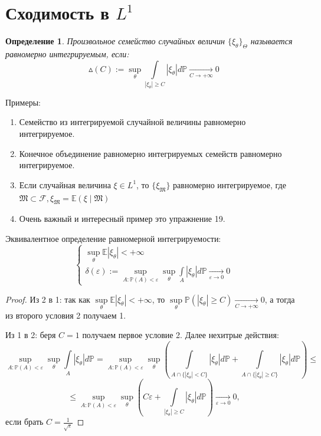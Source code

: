 \documentclass[12pt,a4paper]{article} %
\newtheorem{definition}{Определение}
\newcommand{\E}{\mathbb{E}}
\newcommand{\PR}{\mathbb{P}}
\newcommand{\F}{\mathcal{F}}
\newcommand{\M}{\mathfrak{M}}
\begin{document}
	\section{Сходимость в $L^1$}
	\begin{definition}
		Произвольное семейство случайных величин $\{\xi_{\theta}\}_{\Theta}$ называется равномерно интегрируемым, если:
		$$\vartriangle(C):=\sup\limits_{\theta}\int\limits_{|\xi_{\theta}|\geq C}|\xi_{\theta}|d\PR\xrightarrow[C\rightarrow+\infty]{}0$$
	\end{definition}
	Примеры:
	\begin{enumerate}
		\item Семейство из интегрируемой случайной величины равномерно интегрируемое.
		\item Конечное объединение равномерно интегрируемых семейств равномерно интегрируемое.
		\item Если случайная величина $\xi\in L^1$, то $\{\xi_{\M}\}$ равномерно интегрируемое, где \\$\M\subset\F,\xi_{\M}=\E(\xi\mid\M)$
		\item Очень важный и интересный пример это упражнение 19.
	\end{enumerate}
	Эквивалентное определение равномерной интегрируемости:
	\begin{equation}
		\begin{cases}
			\sup\limits_{\theta}\E|\xi_{\theta}|<+\infty\\
			\delta(\varepsilon):=\sup\limits_{A:\PR(A)<\varepsilon}\sup\limits_{\theta}\displaystyle\int\limits_A|\xi_{\theta}|d\PR\xrightarrow[\varepsilon\rightarrow0]{}0
		\end{cases}
	\end{equation}
	\begin{proof}
		Из 2 в 1: так как $\sup\limits_{\theta}\E|\xi_{\theta}|<+\infty$, то $\sup\limits_{\theta}\PR(|\xi_{\theta}|\geq C)\xrightarrow[C\rightarrow+\infty]{}0$, а тогда из второго условия 2 получаем 1.
		
		Из 1 в 2: беря $C=1$ получаем первое условие 2. Далее нехитрые действия:
		$$\sup\limits_{A:\PR(A)<\varepsilon}\sup\limits_{\theta}\displaystyle\int\limits_A|\xi_{\theta}|d\PR=\sup\limits_{A:\PR(A)<\varepsilon}\sup\limits_{\theta}\left(\displaystyle\int\limits_{A\cap\{|\xi_{\theta}|<C\}}|\xi_{\theta}|d\PR+\displaystyle\int\limits_{A\cap\{|\xi_{\theta}|\geq C\}}|\xi_{\theta}|d\PR\right)\leq$$
		$$\leq\sup\limits_{A:\PR(A)<\varepsilon}\sup\limits_{\theta}\left(C\varepsilon+\displaystyle\int\limits_{|\xi_{\theta}|\geq C}|\xi_{\theta}|d\PR\right)\xrightarrow[\varepsilon\rightarrow0]{}0,$$
		если брать $C=\frac{1}{\sqrt{\varepsilon}}$
	\end{proof}
\end{document}
